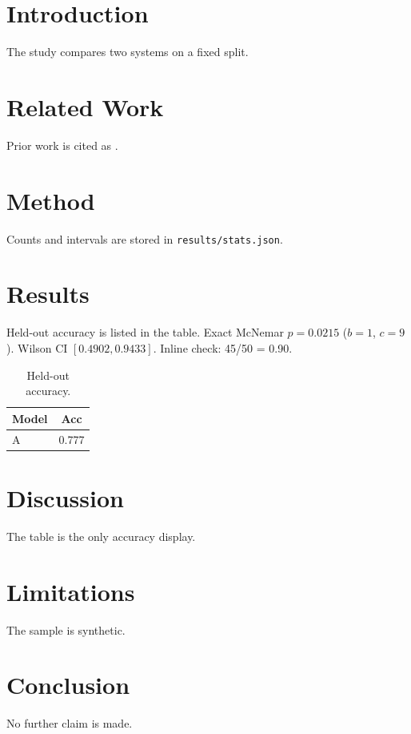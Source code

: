 \documentclass{article}
\begin{document}
\begin{abstract}
Synthetic submission used only as a mechanical-check fixture.
\end{abstract}
\section{Introduction}
The study compares two systems on a fixed split.
\section{Related Work}
Prior work is cited as \cite{vaswani2017}.
\section{Method}
Counts and intervals are stored in \texttt{results/stats.json}.

\section{Results}
Held-out accuracy is listed in the table.
Exact McNemar $p=0.0215$ ($b=1$, $c=9$).
Wilson CI $[0.4902, 0.9433]$.
Inline check: 45/50 = 0.90.

\begin{table}
\caption{Held-out accuracy.}
\label{tab:acc}
\begin{tabular}{lc}
\toprule
Model & Acc \\
\midrule
A & 0.777 \\
\bottomrule
\end{tabular}
\end{table}
\section{Discussion}
The table is the only accuracy display.
\section{Limitations}
The sample is synthetic.
\section{Conclusion}
No further claim is made.
\end{document}
